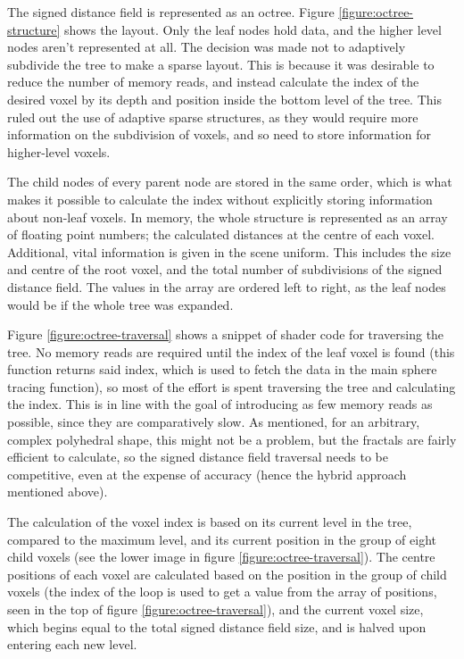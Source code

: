 The signed distance field is represented as an octree. Figure \ref{figure:octree-structure} shows the layout. Only the leaf nodes hold data, and the higher level nodes aren't represented at all. The decision was made not to adaptively subdivide the tree to make a sparse layout. This is because it was desirable to reduce the number of memory reads, and instead calculate the index of the desired voxel by its depth and position inside the bottom level of the tree. This ruled out the use of adaptive sparse structures, as they would require more information on the subdivision of voxels, and so need to store information for higher-level voxels.\newline

The child nodes of every parent node are stored in the same order, which is what makes it possible to calculate the index without explicitly storing information about non-leaf voxels. In memory, the whole structure is represented as an array of floating point numbers; the calculated distances at the centre of each voxel. Additional, vital information is given in the scene uniform. This includes the size and centre of the root voxel, and the total number of subdivisions of the signed distance field. The values in the array are ordered left to right, as the leaf nodes would be if the whole tree was expanded.\newline

Figure \ref{figure:octree-traversal} shows a snippet of shader code for traversing the tree. No memory reads are required until the index of the leaf voxel is found (this function returns said index, which is used to fetch the data in the main sphere tracing function), so most of the effort is spent traversing the tree and calculating the index. This is in line with the goal of introducing as few memory reads as possible, since they are comparatively slow. As mentioned, for an arbitrary, complex polyhedral shape, this might not be a problem, but the fractals are fairly efficient to calculate, so the signed distance field traversal needs to be competitive, even at the expense of accuracy (hence the hybrid approach mentioned above).\newline

The calculation of the voxel index is based on its current level in the tree, compared to the maximum level, and its current position in the group of eight child voxels (see the lower image in figure \ref{figure:octree-traversal}). The centre positions of each voxel are calculated based on the position in the group of child voxels (the index of the loop is used to get a value from the array of positions, seen in the top of figure \ref{figure:octree-traversal}), and the current voxel size, which begins equal to the total signed distance field size, and is halved upon entering each new level.\newline

